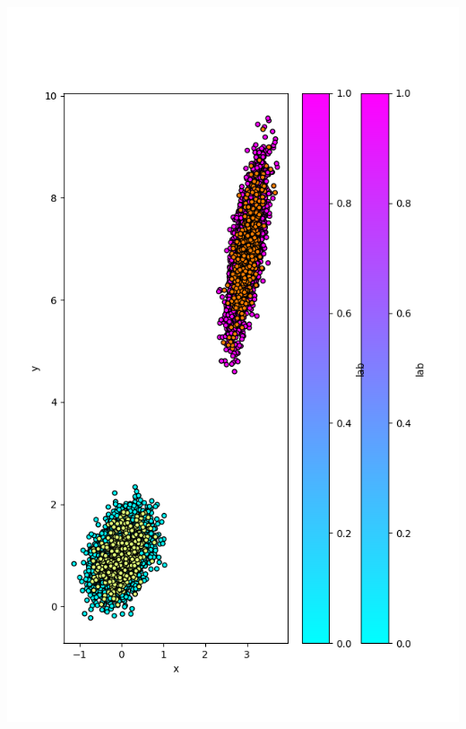 \documentclass{article}
\begin{document}
\begin{enumerate}
  \noindent\includegraphics[scale=0.5]{plot_500}
\end{enumerate}
\end{document}

